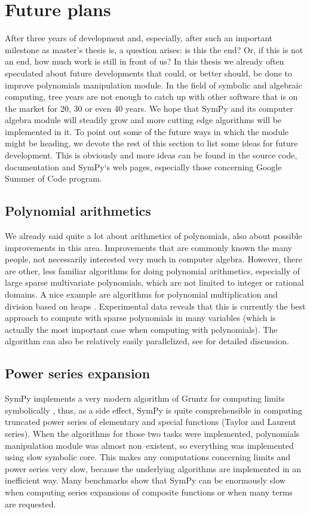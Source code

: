 \section{Future plans}

After three years of development and, especially, after such an important milestone as master's
thesis is, a question arises: is this the end? Or, if this is not an end, how much work is still
in front of us? In this thesis we already often speculated about future developments that could,
or better should, be done to improve polynomials manipulation module. In the field of symbolic
and algebraic computing, tree years are not enough to catch up with other software that is on
the market for 20, 30 or even 40 years. We hope that SymPy and its computer algebra module
will steadily grow and more cutting edge algorithms will be implemented in it. To point out
some of the future ways in which the module might be heading, we devote the rest of this section
to list some ideas for future development. This is obviously and more ideas can be found in
the source code, documentation and SymPy`s web pages, especially those concerning Google
Summer of Code program.


\subsection{Polynomial arithmetics}

We already said quite a lot about arithmetics of polynomials, also about possible improvements
in this area. Improvements that are commonly known the many people, not necessarily interested
very much in computer algebra. However, there are other, less familiar algorithms for doing
polynomial arithmetics, especially of large sparse multivariate polynomials, which are not
limited to integer or rational domains. A nice example are algorithms for polynomial multiplication
and division based on heaps \cite{Monagan2007heaps}. Experimental data reveals that this is currently
the best approach to compute with sparse polynomials in many variables (which is actually the
most important case when computing with polynomials). The algorithm can also be relatively
easily parallelized, see \cite{Monagan2009parallel} for detailed discussion.


\subsection{Power series expansion}

SymPy implements a very modern algorithm of Gruntz for computing limits symbolically \cite{Gruntz1996limits},
thus, as a side effect, SymPy is quite comprehensible in computing truncated power series of elementary
and special functions (Taylor and Laurent series). When the algorithms for those two tasks were implemented,
polynomials manipulation module was almost non--existent, so everything was implemented using slow symbolic
core. This makes any computations concerning limits and power series very slow, because the underlying
algorithms are implemented in an inefficient way. Many benchmarks show that SymPy can be enormously slow
when computing series expansions of composite functions or when many terms are requested.


